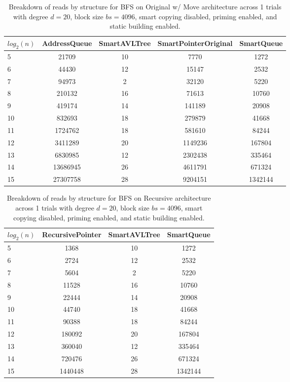 \begin{table}[]
\centering
\begin{tabular}{|l|c|c|c|c|}
$log_2(n)$ & AddressQueue & SmartAVLTree & SmartPointerOriginal & SmartQueue \\ \hline
5 & 21709 & 10 & 7770 & 1272 \\ \hline
6 & 44430 & 12 & 15147 & 2532 \\ \hline
7 & 94973 & 2 & 32120 & 5220 \\ \hline
8 & 210132 & 16 & 71613 & 10760 \\ \hline
9 & 419174 & 14 & 141189 & 20908 \\ \hline
10 & 832693 & 18 & 279879 & 41668 \\ \hline
11 & 1724762 & 18 & 581610 & 84244 \\ \hline
12 & 3411289 & 20 & 1149236 & 167804 \\ \hline
13 & 6830985 & 12 & 2302438 & 335464 \\ \hline
14 & 13686945 & 26 & 4611791 & 671324 \\ \hline
15 & 27307758 & 28 & 9204151 & 1342144 \\ \hline
\end{tabular}
\caption{Breakdown of reads by structure for BFS on Original w/ Move architecture across 1 trials with degree $d=20$, block size $bs=4096$, smart copying disabled, priming enabled, and static building enabled.}
    \label{tab:reads_by_structure_bfs_d20_bs4096_trials1_copiesfalse_primetrue_staticinsertiontrue_ptoriginal_movetrue}
\end{table}

\begin{table}[]
\centering
\begin{tabular}{|l|c|c|c|}
$log_2(n)$ & RecursivePointer & SmartAVLTree & SmartQueue \\ \hline
5 & 1368 & 10 & 1272 \\ \hline
6 & 2724 & 12 & 2532 \\ \hline
7 & 5604 & 2 & 5220 \\ \hline
8 & 11528 & 16 & 10760 \\ \hline
9 & 22444 & 14 & 20908 \\ \hline
10 & 44740 & 18 & 41668 \\ \hline
11 & 90388 & 18 & 84244 \\ \hline
12 & 180092 & 20 & 167804 \\ \hline
13 & 360040 & 12 & 335464 \\ \hline
14 & 720476 & 26 & 671324 \\ \hline
15 & 1440448 & 28 & 1342144 \\ \hline
\end{tabular}
\caption{Breakdown of reads by structure for BFS on Recursive architecture across 1 trials with degree $d=20$, block size $bs=4096$, smart copying disabled, priming enabled, and static building enabled.}
    \label{tab:reads_by_structure_bfs_d20_bs4096_trials1_copiesfalse_primetrue_staticinsertiontrue_ptrecursive_movetrue}
\end{table}

